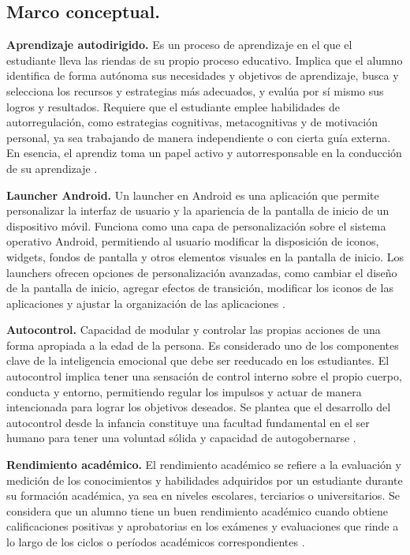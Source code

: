 \subsection{Marco conceptual.}

\textbf{Aprendizaje autodirigido.} Es un proceso de aprendizaje en el que el estudiante lleva las riendas de su propio proceso educativo. Implica que el alumno identifica de forma autónoma sus necesidades y objetivos de aprendizaje, busca y selecciona los recursos y estrategias más adecuados, y evalúa por sí mismo sus logros y resultados. Requiere que el estudiante emplee habilidades de autorregulación, como estrategias cognitivas, metacognitivas y de motivación personal, ya sea trabajando de manera independiente o con cierta guía externa. En esencia, el aprendiz toma un papel activo y autorresponsable en la conducción de su aprendizaje \cite{Marquez2014}.

\textbf{Launcher Android.} Un launcher en Android es una aplicación que permite personalizar la interfaz de usuario y la apariencia de la pantalla de inicio de un dispositivo móvil. Funciona como una capa de personalización sobre el sistema operativo Android, permitiendo al usuario modificar la disposición de iconos, widgets, fondos de pantalla y otros elementos visuales en la pantalla de inicio. Los launchers ofrecen opciones de personalización avanzadas, como cambiar el diseño de la pantalla de inicio, agregar efectos de transición, modificar los iconos de las aplicaciones y ajustar la organización de las aplicaciones \cite{Launcher}.

\textbf{Autocontrol.} Capacidad de modular y controlar las propias acciones de una forma apropiada a la edad de la persona. Es considerado uno de los componentes clave de la inteligencia emocional que debe ser reeducado en los estudiantes. El autocontrol implica tener una sensación de control interno sobre el propio cuerpo, conducta y entorno, permitiendo regular los impulsos y actuar de manera intencionada para lograr los objetivos deseados. Se plantea que el desarrollo del autocontrol desde la infancia constituye una facultad fundamental en el ser humano para tener una voluntad sólida y capacidad de autogobernarse \cite{Navarro2003}. 

\textbf{Rendimiento académico.} El rendimiento académico se refiere a la evaluación y medición de los conocimientos y habilidades adquiridos por un estudiante durante su formación académica, ya sea en niveles escolares, terciarios o universitarios. Se considera que un alumno tiene un buen rendimiento académico cuando obtiene calificaciones positivas y aprobatorias en los exámenes y evaluaciones que rinde a lo largo de los ciclos o períodos académicos correspondientes \cite{RendimientoEscolar}.

